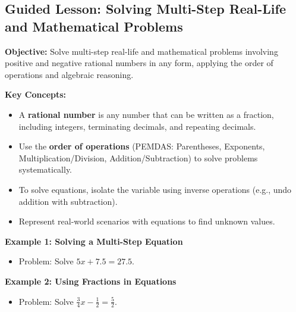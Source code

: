 \documentclass[12pt]{article}
\title{}
\date{}
\begin{document}
\subsection*{Guided Lesson: Solving Multi-Step Real-Life and Mathematical Problems}
\onehalfspacing

\begin{tcolorbox}[colframe=black!40, colback=gray!5, 
coltitle=black, colbacktitle=black!20, fonttitle=\bfseries\Large, 
title=Learning Objective, halign title=center, left=5pt, right=5pt, top=5pt, bottom=15pt]
\textbf{Objective:} Solve multi-step real-life and mathematical problems involving positive and negative rational numbers in any form, applying the order of operations and algebraic reasoning.
\end{tcolorbox}

\vspace{1em}

\begin{tcolorbox}[colframe=black!60, colback=white, 
coltitle=black, colbacktitle=black!15, fonttitle=\bfseries\Large, 
title=Key Concepts and Vocabulary, halign title=center, left=10pt, right=10pt, top=10pt, bottom=15pt]
\textbf{Key Concepts:}
\begin{itemize}
    \item A \textbf{rational number} is any number that can be written as a fraction, including integers, terminating decimals, and repeating decimals.
    \item Use the \textbf{order of operations} (PEMDAS: Parentheses, Exponents, Multiplication/Division, Addition/Subtraction) to solve problems systematically.
    \item To solve equations, isolate the variable using inverse operations (e.g., undo addition with subtraction).
    \item Represent real-world scenarios with equations to find unknown values.
\end{itemize}
\end{tcolorbox}

\vspace{1em}

\begin{tcolorbox}[colframe=black!60, colback=white, 
coltitle=black, colbacktitle=black!15, fonttitle=\bfseries\Large, 
title=Examples, halign title=center, left=10pt, right=10pt, top=10pt, bottom=15pt]
\textbf{Example 1: Solving a Multi-Step Equation}
\begin{itemize}
    \item Problem: Solve \( 5x + 7.5 = 27.5 \).
\end{itemize}

\textbf{Example 2: Using Fractions in Equations}
\begin{itemize}
    \item Problem: Solve \( \frac{3}{4}x - \frac{1}{2} = \frac{5}{2} \).
\end{itemize}
\end{tcolorbox}
\end{document}
